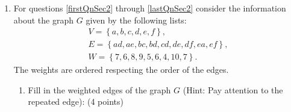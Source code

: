 \documentclass[12pt]{exam}
\begin{document}
\begin{enumerate}
\newpage
\item For questions \ref{firstQnSec2} through \ref{lastQnSec2} consider the information about the graph $G$ given by the following lists:
\begin{gather*}
    V=\left\lbrace a,b,c,d,e,f\right\rbrace,\\
    E=\left\lbrace ad,ae,bc,bd,cd,de,df,ea,ef\right\rbrace,\\
    W=\left\lbrace 7,6,8,9,5,6,4,10,7\right\rbrace.
\end{gather*}
The weights are ordered respecting the order of the edges.
\begin{enumerate}
\item \label{firstQnSec2} Fill in the weighted edges of the graph $G$ (Hint: Pay attention to the repeated edge): (4 points)
\begin{figure}[h!]
    \centering
   



    \begin{tikzpicture}[x=0.75pt,y=0.75pt,yscale=-1,xscale=1]
    

\end{tikzpicture}
\end{figure}
\end{enumerate}
\end{enumerate}
\end{document}
